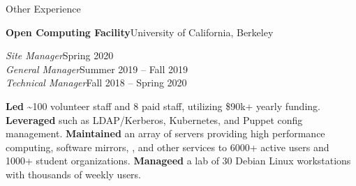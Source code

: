\begin{minipage}[t]{0.665\textwidth}




  \vspace{10pt}

  {\sectionfont Other Experience}

  \vspace{5pt}
  \textbf{Open Computing Facility}\quad{}\hfill University of California, Berkeley
  \begin{adjustwidth}{10pt}{}
    \emph{Site Manager}\hfill Spring 2020\\
    \emph{General Manager}\hfill Summer 2019 -- Fall 2019\\
    \emph{Technical Manager}\hfill Fall 2018 -- Spring 2020

    \textbf{Led} \textasciitilde{}100 volunteer staff and 8 paid staff, utilizing \$90k+ yearly funding.
    \textbf{Leveraged}  such as LDAP/Kerberos, Kubernetes, and Puppet config management.
    \textbf{Maintained} an array of servers providing high performance computing, software mirrors, , and other services to 6000+ active users and 1000+ student organizations.
    \textbf{Manageed} a lab of 30 Debian Linux workstations with thousands of weekly users.

  \end{adjustwidth}




\end{minipage}
